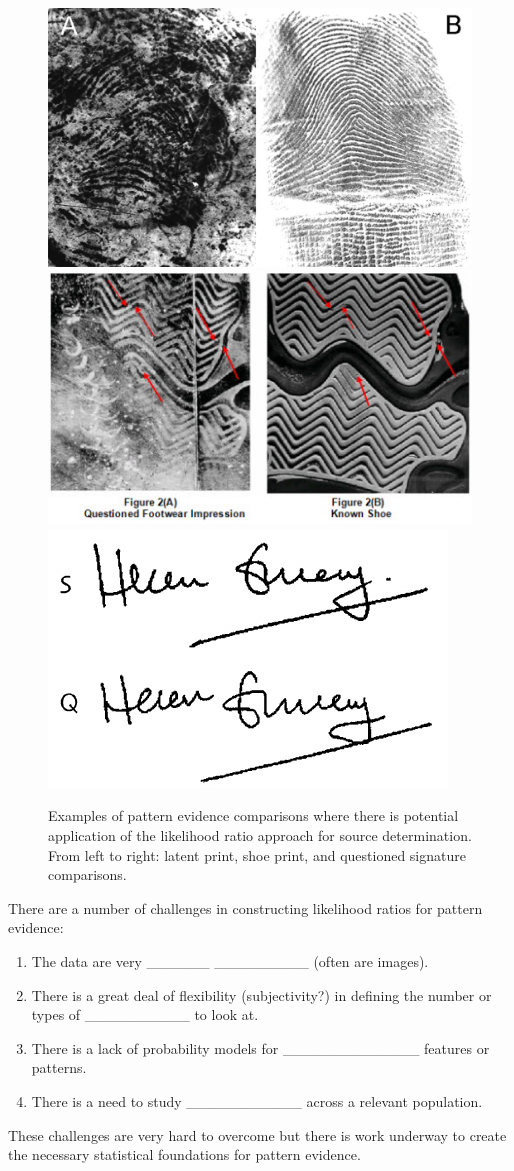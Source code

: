 \documentclass[]{book}
\providecommand{\tightlist}{%
  \setlength{\itemsep}{0pt}\setlength{\parskip}{0pt}}
\theoremstyle{definition}
\theoremstyle{definition}
\theoremstyle{remark}
\begin{document}
\begin{figure}
\includegraphics[width=0.32\linewidth]{img/mayfieldfinger} \includegraphics[width=0.32\linewidth]{img/shoecompare} \includegraphics[width=0.32\linewidth]{img/signature} \caption{Examples of pattern evidence comparisons where there is potential application of the likelihood ratio approach for source determination. From left to right: latent print, shoe print, and questioned signature comparisons.}\label{fig:trace}
\end{figure}

There are a number of challenges in constructing likelihood ratios for
pattern evidence:

\begin{enumerate}
\def\labelenumi{\arabic{enumi}.}
\tightlist
\item
  The data are very \_\_\_\_\_\_ \_\_\_\_\_\_\_\_\_ (often are images).
  \vspace{.1in}
\item
  There is a great deal of flexibility (subjectivity?) in defining the
  number or types of \_\_\_\_\_\_\_\_\_\_ to look at. \vspace{.1in}
\item
  There is a lack of probability models for \_\_\_\_\_\_\_\_\_\_\_\_\_
  features or patterns. \vspace{.1in}
\item
  There is a need to study \_\_\_\_\_\_\_\_\_\_\_ across a relevant
  population.
\end{enumerate}

These challenges are very hard to overcome but there is work underway to
create the necessary statistical foundations for pattern evidence.
\end{document}
